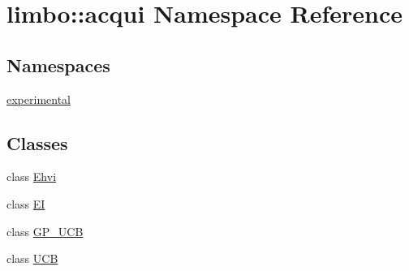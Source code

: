 \hypertarget{namespacelimbo_1_1acqui}{}\section{limbo\+:\+:acqui Namespace Reference}
\label{namespacelimbo_1_1acqui}
\subsection*{Namespaces}
\begin{DoxyCompactItemize}
\item 
 \hyperlink{namespacelimbo_1_1acqui_1_1experimental}{experimental}
\end{DoxyCompactItemize}
\subsection*{Classes}
\begin{DoxyCompactItemize}
\item 
class \hyperlink{classlimbo_1_1acqui_1_1_ehvi}{Ehvi}
\item 
class \hyperlink{classlimbo_1_1acqui_1_1_e_i}{EI}
\item 
class \hyperlink{classlimbo_1_1acqui_1_1_g_p___u_c_b}{G\+P\+\_\+\+U\+CB}
\item 
class \hyperlink{classlimbo_1_1acqui_1_1_u_c_b}{U\+CB}
\end{DoxyCompactItemize}
